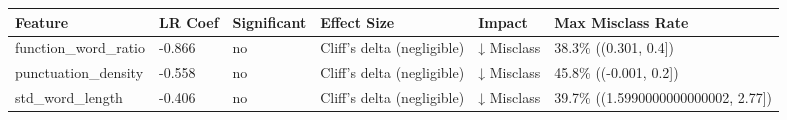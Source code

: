 \begin{tabular}{llllll}
\toprule
Feature & LR Coef & Significant & Effect Size & Impact & Max Misclass Rate \\
\midrule
function\_word\_ratio & -0.866 & no & Cliff's delta (negligible) & ↓ Misclass & 38.3\% ((0.301, 0.4]) \\
punctuation\_density & -0.558 & no & Cliff's delta (negligible) & ↓ Misclass & 45.8\% ((-0.001, 0.2]) \\
std\_word\_length & -0.406 & no & Cliff's delta (negligible) & ↓ Misclass & 39.7\% ((1.5990000000000002, 2.77]) \\
\bottomrule
\end{tabular}
